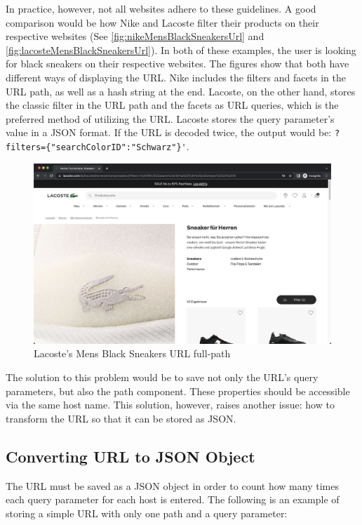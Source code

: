 In practice, however, not all websites adhere to these guidelines. A good comparison would be how Nike and Lacoste filter their products on their respective websites (See \autoref{fig:nikeMensBlackSneakersUrl} and \autoref{fig:lacosteMensBlackSneakersUrl}). In both of these examples, the user is looking for black sneakers on their respective websites. The figures show that both have different ways of displaying the URL. Nike includes the filters and facets in the URL path, as well as a hash string at the end. Lacoste, on the other hand, stores the classic filter in the URL path and the facets as URL queries, which is the preferred method of utilizing the URL. Lacoste stores the query parameter's value in a JSON format. If the URL is decoded twice, the output would be: \verb;?filters={"searchColorID":"Schwarz"}';.

\begin{figure}[H]
  \includegraphics[width=\textwidth]{assets/Lacoste_Screenshot_2022-08-11_at_11.48.10.png}
  \caption{Lacoste's Mens Black Sneakers URL full-path}
  \label{fig:lacosteMensBlackSneakersUrl}
\end{figure}

The solution to this problem would be to save not only the URL's query parameters, but also the path component. These properties should be accessible via the same host name. This solution, however, raises another issue: how to transform the URL so that it can be stored as JSON.

\subsection*{Converting URL to JSON Object}
The URL must be saved as a JSON object in order to count how many times each query parameter for each host is entered. The following is an example of storing a simple URL with only one path and a query parameter:

